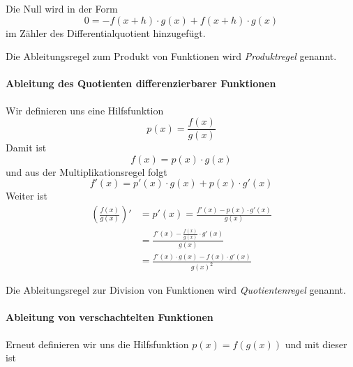 \noindent Die Null wird in der Form
\begin{equation*}
0 = -f(x+h)\cdot g(x)+f(x+h)\cdot g(x)
\end{equation*}
im Zähler des Differentialquotient hinzugefügt.

\begin{definition}
Die Ableitungsregel zum Produkt von Funktionen wird \emph{Produktregel} genannt.
\end{definition}

\paragraph{Ableitung des Quotienten differenzierbarer Funktionen}

Wir definieren uns eine Hilfsfunktion 
\begin{equation*}
p(x) = \frac{f(x)}{g(x)}
\end{equation*}
Damit ist 
\begin{equation*}
f(x) = p(x) \cdot g(x)
\end{equation*}
und aus der Multiplikationsregel folgt
\begin{equation*}
f'(x) = p'(x)\cdot g(x)+p(x)\cdot g'(x)
\end{equation*}
Weiter ist
\begin{equation}\label{eq:diff3}
\begin{split}
\left( \frac{f(x)}{g(x)} \right)' &= p'(x) = \frac{f'(x)-p(x)\cdot g'(x)}{g(x)} \\
&= \frac{f'(x)-\frac{f(x)}{g(x)}\cdot g'(x)}{g(x)} \\
&= \frac{f'(x)\cdot g(x)-f(x)\cdot g'(x)}{g(x)^2}
\end{split}
\end{equation}

\begin{definition}
Die Ableitungsregel zur Division von Funktionen wird \emph{Quotientenregel} genannt.
\end{definition}

\paragraph{Ableitung von verschachtelten Funktionen}
Erneut definieren wir uns die Hilfsfunktion $p(x) = f(g(x))$ und mit dieser ist

